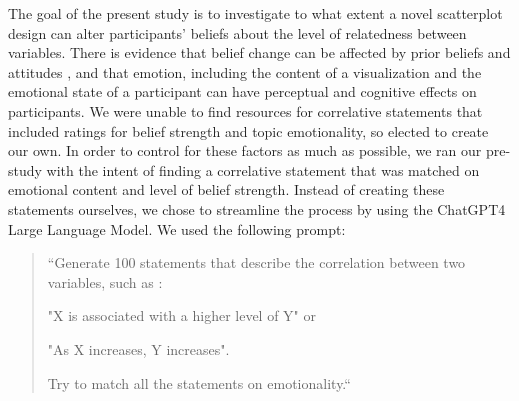 \documentclass[manuscript,screen,review,anonymous]{acmart}
\begin{document}
The goal of the present study is to investigate to what extent a novel
scatterplot design can alter participants' beliefs about the level of
relatedness between variables. There is evidence that belief change can
be affected by prior beliefs and attitudes
\citep{xiong_2022, markant_2023}, and that emotion, including the
content of a visualization \citep{phelps_2006, harrison_2013} and the
emotional state of a participant \citep{thoresen_2016} can have
perceptual and cognitive effects on participants. We were unable to find
resources for correlative statements that included ratings for belief
strength and topic emotionality, so elected to create our own. In order
to control for these factors as much as possible, we ran our pre-study
with the intent of finding a correlative statement that was matched on
emotional content and level of belief strength. Instead of creating
these statements ourselves, we chose to streamline the process by using
the ChatGPT4 Large Language Model. We used the following prompt:

\begin{quotation}

    ``Generate 100 statements that describe the correlation between two variables, such as :

     "X is associated with a higher level of Y" or

     "As X increases, Y increases".

    Try to match all the statements on emotionality.``
    
\end{quotation}
\end{document}
